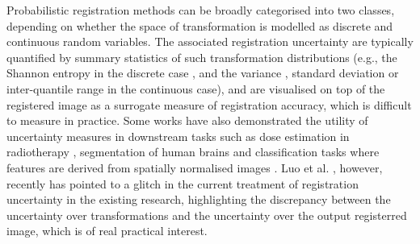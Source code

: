 Probabilistic registration methods can be broadly categorised into two classes, depending on whether the space of transformation is modelled as discrete \cite{cobzas2011random,popuri2013variational,heinrich2016deformable} and continuous \cite{van2008encoding,simpson2012probabilistic,risholm2013bayesian,zhang2013bayesian,wassermann2014probabilistic,simpson2015probabilistic,le2016quantifying} random variables. The associated registration uncertainty are typically quantified by summary statistics of such transformation distributions (e.g., the Shannon entropy in the discrete case \cite{lotfi2013improving}, and the variance \cite{simpson2012probabilistic,le2016quantifying}, standard deviation\cite{simpson2015probabilistic} or inter-quantile range \cite{risholm2013bayesian,risholm2010summarizing} in the continuous case), and are visualised on top of the registered image as a surrogate measure of registration accuracy, which is difficult to measure in practice. Some works have also demonstrated the utility of uncertainty measures in downstream tasks such as dose estimation in radiotherapy \cite{risholm2011estimation}, segmentation of human brains \cite{simpson2011probabilistic} and classification tasks where features are derived from spatially normalised images \cite{simpson2012ensemble}. Luo et al. \cite{wells2018miccai}, however, recently has pointed to a glitch in the current treatment of registration uncertainty in the existing research, highlighting the discrepancy between the  uncertainty over transformations and the uncertainty over the output registerred image, which is of real practical interest. 




%
%



